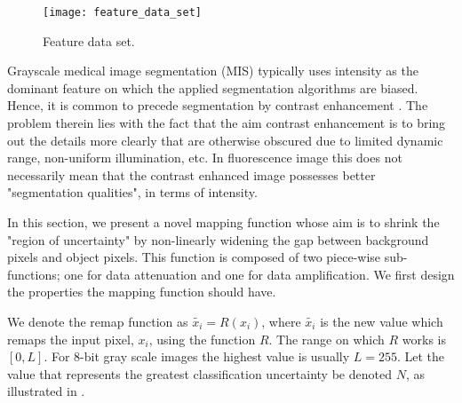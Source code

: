 \begin{figure}[!h]
	\centering
	\texttt{[image: feature\_data\_set]}
	\caption{Feature data set.}
	\label{fig:featuredataset}
\end{figure}

Grayscale medical image segmentation (MIS) typically uses intensity as the dominant feature on which the applied segmentation algorithms are biased. Hence, it is common to precede segmentation by contrast enhancement \citep{Kim2003,Subr2005}. The problem therein lies with the fact that the aim contrast enhancement is to bring out the details more clearly that are otherwise obscured due to limited dynamic range, non-uniform illumination, etc. In fluorescence image this does not necessarily mean that the contrast enhanced image possesses better "segmentation qualities", in terms of intensity.

In this section, we present a novel mapping function whose aim is to shrink the "region of uncertainty" by non-linearly widening the gap between background pixels and object pixels. This function is composed of two piece-wise sub-functions; one for data attenuation and one for data amplification. We first design the properties the mapping function should have. 

\begin{definition}
	We denote the remap function as $\widetilde{x_i} = R(x_i)$, where $\widetilde{x_i}$ is the new value which remaps the input pixel, $x_i$, using the function $R$. The range on which $R$ works is $[0,L]$. For 8-bit gray scale images the highest value is usually $L=255$. Let the value that represents the greatest classification uncertainty be denoted $N$, as illustrated in .
\end{definition}

